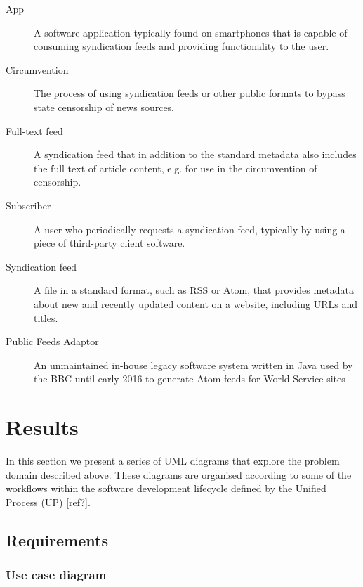 \documentclass{article}
\begin{document}
\begin{description}

\item [App]
A software application typically found on smartphones that is capable of consuming syndication feeds and providing functionality to the user.

\item [Circumvention]
The process of using syndication feeds or other public formats to bypass state censorship of news sources.

\item [Full-text feed]
A syndication feed that in addition to the standard metadata also includes the full text of article content, e.g. for use in the circumvention of censorship.

\item [Subscriber]
A user who periodically requests a syndication feed, typically by using a piece of third-party client software.

\item [Syndication feed]
A file in a standard format, such as RSS or Atom, that provides metadata about new and recently updated content on a website, including URLs and titles.

\item [Public Feeds Adaptor]
An unmaintained in-house legacy software system written in Java used by the BBC until early 2016 to generate Atom feeds for World Service sites

\end{description}

\section{Results}

In this section we present a series of UML diagrams that explore the problem domain described above. These diagrams are organised according to some of the workflows within the software development lifecycle defined by the Unified Process (UP) [ref?].

\subsection{Requirements}

\subsubsection{Use case diagram}
\end{document}
